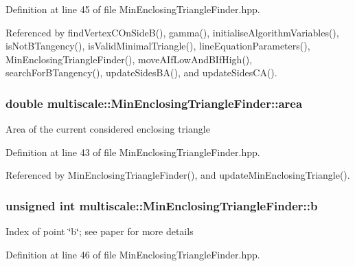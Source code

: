 Definition at line 45 of file Min\-Enclosing\-Triangle\-Finder.\-hpp.



Referenced by find\-Vertex\-C\-On\-Side\-B(), gamma(), initialise\-Algorithm\-Variables(), is\-Not\-B\-Tangency(), is\-Valid\-Minimal\-Triangle(), line\-Equation\-Parameters(), Min\-Enclosing\-Triangle\-Finder(), move\-A\-If\-Low\-And\-B\-If\-High(), search\-For\-B\-Tangency(), update\-Sides\-B\-A(), and update\-Sides\-C\-A().

\hypertarget{classmultiscale_1_1MinEnclosingTriangleFinder_a64ea18728dc70fd6235961c12802123a}{
\subsubsection[{area}]{\setlength{\rightskip}{0pt plus 5cm}double multiscale\-::\-Min\-Enclosing\-Triangle\-Finder\-::area\hspace{0.3cm}{\ttfamily [private]}}}\label{classmultiscale_1_1MinEnclosingTriangleFinder_a64ea18728dc70fd6235961c12802123a}
Area of the current considered enclosing triangle 

Definition at line 43 of file Min\-Enclosing\-Triangle\-Finder.\-hpp.



Referenced by Min\-Enclosing\-Triangle\-Finder(), and update\-Min\-Enclosing\-Triangle().

\hypertarget{classmultiscale_1_1MinEnclosingTriangleFinder_a71355f44126b38a4fb55c0c92ab64816}{
\subsubsection[{b}]{\setlength{\rightskip}{0pt plus 5cm}unsigned int multiscale\-::\-Min\-Enclosing\-Triangle\-Finder\-::b\hspace{0.3cm}{\ttfamily [private]}}}\label{classmultiscale_1_1MinEnclosingTriangleFinder_a71355f44126b38a4fb55c0c92ab64816}
Index of point \char`\"{}b\char`\"{}; see paper for more details 

Definition at line 46 of file Min\-Enclosing\-Triangle\-Finder.\-hpp.



